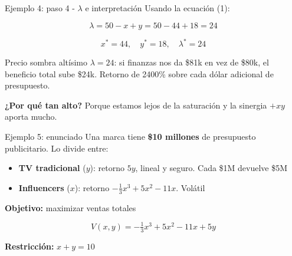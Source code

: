 \documentclass{beamer}
\begin{document}
\begin{frame}{Ejemplo 4: paso 4 - $\lambda$ e interpretación}
    \small
    Usando la ecuación (1):

    \[
    \lambda = 50 - x + y = 50 - 44 + 18 = 24
    \]

    \vspace{0.5em}

    \[
    \boxed{x^* = 44, \quad y^* = 18, \quad \lambda^* = 24}
    \]

    \vspace{0.8em}

    \begin{alertblock}{Precio sombra altísimo}
        $\lambda = 24$: si finanzas nos da \$81k en vez de \$80k, el beneficio total sube \$24k. Retorno de 2400\% sobre cada dólar adicional de presupuesto.
    \end{alertblock}

    \vspace{0.3em}

    \textbf{¿Por qué tan alto?} Porque estamos lejos de la saturación y la sinergia $+xy$ aporta mucho.
\end{frame}


\begin{frame}{Ejemplo 5: enunciado}
    \small
    Una marca tiene \textbf{\$10 millones} de presupuesto publicitario. Lo divide entre:
    \begin{itemize}
        \item \textbf{TV tradicional} ($y$): retorno $5y$, lineal y seguro. Cada \$1M devuelve \$5M
        \item \textbf{Influencers} ($x$): retorno $-\frac{1}{3}x^3 + 5x^2 - 11x$. Volátil
    \end{itemize}

    \vspace{0.5em}

    \textbf{Objetivo:} maximizar ventas totales

    \[
    V(x, y) = -\tfrac{1}{3}x^3 + 5x^2 - 11x + 5y
    \]

    \vspace{0.3em}

    \textbf{Restricción:} $x + y = 10$
\end{frame}
\end{document}
